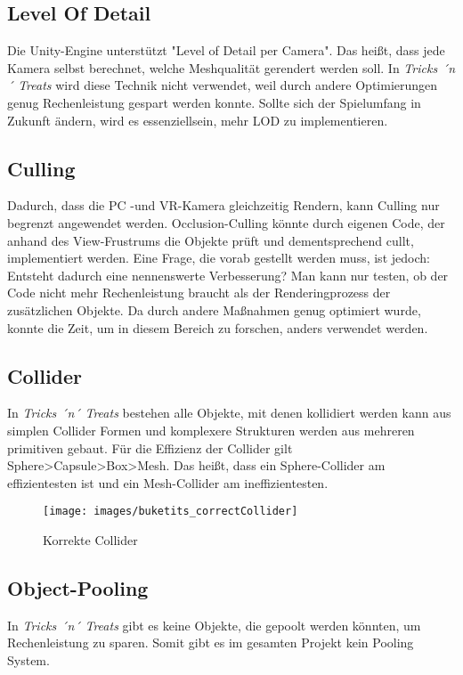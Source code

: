 \subsection{Level Of Detail}
Die Unity-Engine unterstützt "Level of Detail per Camera". Das heißt, dass jede Kamera selbst berechnet, welche Meshqualität gerendert werden soll. In \emph{Tricks ´n´ Treats} wird diese Technik nicht verwendet, weil durch andere Optimierungen genug Rechenleistung gespart werden konnte. Sollte sich der Spielumfang in Zukunft ändern, wird es essenziellsein, mehr LOD zu implementieren.

\subsection{Culling}
Dadurch, dass die PC -und VR-Kamera gleichzeitig Rendern, kann Culling nur begrenzt angewendet werden. Occlusion-Culling könnte durch eigenen Code, der anhand des View-Frustrums die Objekte prüft und dementsprechend cullt, implementiert werden. Eine Frage, die vorab gestellt werden muss, ist jedoch: Entsteht dadurch eine nennenswerte Verbesserung? Man kann nur testen, ob der Code nicht mehr Rechenleistung braucht als der Renderingprozess der zusätzlichen Objekte. Da durch andere Maßnahmen genug optimiert wurde, konnte die Zeit, um in diesem Bereich zu forschen, anders verwendet werden.

\subsection{Collider}
In \emph{Tricks ´n´ Treats} bestehen alle Objekte, mit denen kollidiert werden kann aus simplen Collider Formen und komplexere Strukturen werden aus mehreren primitiven gebaut. 
Für die Effizienz der Collider gilt Sphere>Capsule>Box>Mesh. Das heißt, dass ein Sphere-Collider am effizientesten ist und ein Mesh-Collider am ineffizientesten.

\begin{figure}[H]
	\centering
	\texttt{[image: images/buketits\_correctCollider]}
	\caption{Korrekte Collider}
\end{figure}

\subsection{Object-Pooling}
In \emph{Tricks ´n´ Treats} gibt es keine Objekte, die gepoolt werden könnten, um Rechenleistung zu sparen. Somit gibt es im gesamten Projekt kein Pooling System.

